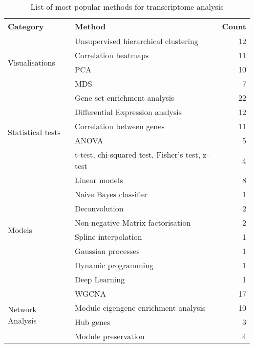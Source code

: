 \begin{table}[ht]
    \centering
    \begin{tabular}{l l r}
    Category & Method & Count \\
    \hline
    \multirow{4}{*}{Visualisations} & Unsupervised hierarchical clustering & 12 \\
                                    & Correlation heatmaps & 11 \\
                                    & PCA & 10 \\
                                    & MDS & 7 \\
    \hline
    \multirow{5}{*}{Statistical tests} & Gene set enrichment analysis & 22 \\
                                       & Differential Expression analysis & 12 \\
                                       & Correlation between genes & 11 \\
                                       & ANOVA & 5 \\
                                       & t-test, chi-squared test, Fisher's test, z-test & 4 \\
    \hline
    \multirow{8}{*}{Models} & Linear models & 8 \\
                            & Naive Bayes classifier & 1 \\
                            & Deconvolution & 2 \\
                            & Non-negative Matrix factorisation & 2 \\
                            & Spline interpolation & 1 \\
                            & Gaussian processes & 1 \\
                            & Dynamic programming & 1 \\
                            & Deep Learning & 1 \\
    \hline
    \multirow{4}{*}{Network Analysis} & WGCNA & 17 \\
                                      & Module eigengene enrichment analysis & 10 \\
                                      & Hub genes & 3 \\
                                      & Module preservation & 4 \\
    \end{tabular}
    \caption{List of most popular methods for transcriptome analysis}
    \label{table:Methods}
\end{table}


